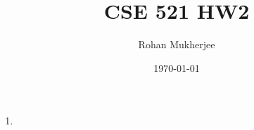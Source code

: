 \documentclass[12pt]{article}
\title{CSE 521 HW2}
\date{\today}
\author{Rohan Mukherjee}
\theoremstyle{definition}
\theoremstyle{remark}
\begin{document}
	\maketitle
	\begin{enumerate}[leftmargin=\labelsep]
		\item 
	\end{enumerate}
\end{document}
